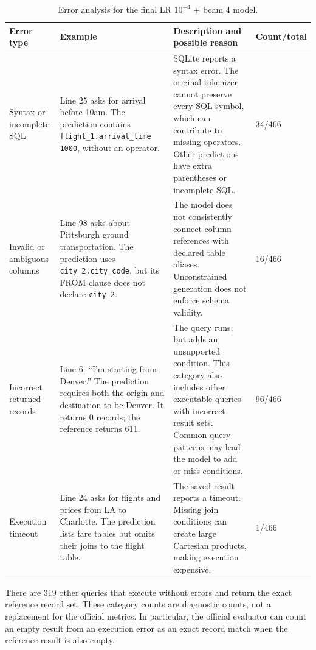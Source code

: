 \documentclass[11pt]{article}
\begin{document}
\begin{table}[h]\centering\small
\renewcommand{\arraystretch}{1.2}
\begin{tabularx}{\textwidth}{p{}Y Y p{0.105\textwidth}}\toprule
Error type & Example & Description and possible reason & Count/total\\\midrule
Syntax or incomplete SQL & Line 25 asks for arrival before 10am. The prediction contains \texttt{flight\_1.arrival\_time 1000}, without an operator. & SQLite reports a syntax error. The original tokenizer cannot preserve every SQL symbol, which can contribute to missing operators. Other predictions have extra parentheses or incomplete SQL. & 34/466\\
Invalid or ambiguous columns & Line 98 asks about Pittsburgh ground transportation. The prediction uses \texttt{city\_2.city\_code}, but its FROM clause does not declare \texttt{city\_2}. & The model does not consistently connect column references with declared table aliases. Unconstrained generation does not enforce schema validity. & 16/466\\
Incorrect returned records & Line 6: ``I'm starting from Denver.'' The prediction requires both the origin and destination to be Denver. It returns 0 records; the reference returns 611. & The query runs, but adds an unsupported condition. This category also includes other executable queries with incorrect result sets. Common query patterns may lead the model to add or miss conditions. & 96/466\\
Execution timeout & Line 24 asks for flights and prices from LA to Charlotte. The prediction lists fare tables but omits their joins to the flight table. & The saved result reports a timeout. Missing join conditions can create large Cartesian products, making execution expensive. & 1/466\\\bottomrule
\end{tabularx}
\caption{Error analysis for the final LR $10^{-4}$ + beam 4 model.}
\end{table}

There are 319 other queries that execute without errors and return the exact reference record set. These category counts are diagnostic counts, not a replacement for the official metrics. In particular, the official evaluator can count an empty result from an execution error as an exact record match when the reference result is also empty.
\end{document}

